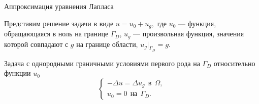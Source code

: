 \documentclass[ignoreonframetext,xcolor=table, unicode, 10pt]{beamer}
\begin{document}
	



\begin{frame}{Аппроксимация уравнения Лапласа}
		
		Представим решение задачи в виде $u = u_0 + u_g,$
		где
		$u_0$ --- функция, обращающаяся в ноль на границе $\Gamma_D$,
		$u_g$ --- произвольная функция, значения которой совпадают с $g$ на границе области, $u_g |_{\Gamma_D} = g$.
		
		\begin{block}{Задача с однородными граничными условиями первого рода на $\Gamma_D$ относительно функции $u_0$}
			\begin{equation*}
				\begin{cases}
					- \Delta u  = \Delta u_g \ \  \text{в}\ \  \Omega, \\
					u_0 = 0 \ \ \text{на}\ \  \Gamma_D.
				\end{cases}			
			\end{equation*}
		\end{block}
		

\end{frame}
\end{document}
